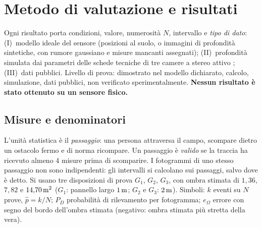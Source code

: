 \section{Metodo di valutazione e risultati}\label{sec:val}

Ogni risultato porta condizioni, valore, numerosità $N$, intervallo e \emph{tipo di dato}: (I)~modello ideale del sensore (posizioni al suolo, o immagini di profondità sintetiche, con rumore gaussiano e misure mancanti assegnati); (II)~profondità simulata dai parametri delle schede tecniche di tre camere a stereo attivo \cite{realsense-confronto-camere,realsense-d455,orbbec-gemini-335}; (III)~dati pubblici. Livello di prova:  dimostrato nel modello dichiarato,  calcolo,  simulazione,  dati pubblici,  non verificato sperimentalmente. \textbf{Nessun risultato è stato ottenuto su un sensore fisico.}

\subsection{Misure e denominatori}\label{sec:val-misure}

L'unità statistica è il \emph{passaggio}: una persona attraversa il campo, scompare dietro un ostacolo fermo e di norma ricompare. Un passaggio è \emph{valido} se la traccia ha ricevuto almeno 4 misure prima di scomparire. I fotogrammi di uno stesso passaggio non sono indipendenti: gli intervalli si calcolano sui passaggi, salvo dove è detto. Si usano tre disposizioni di prova $G_1$, $G_2$, $G_3$, con ombra stimata di $1{,}36$, $7{,}82$ e $14{,}70\,\mathrm{m^2}$ ($G_1$: pannello largo $1\,\mathrm{m}$; $G_2$ e $G_3$: $2\,\mathrm{m}$). Simboli: $k$ eventi su $N$ prove, $\hat p=k/N$; $P_D$ probabilità di rilevamento per fotogramma; $e_\Omega$ errore con segno del bordo dell'ombra stimata (negativo: ombra stimata più stretta della vera).

